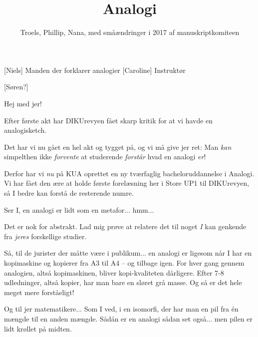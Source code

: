 \documentclass[a4paper,11pt]{article}
\title{Analogi}
\author{Troels, Phillip, Nana, med småændringer i 2017 af manuskriptkomiteen}
\begin{document}
\maketitle

\begin{roles}
[Niels] Manden der forklarer analogier
[Caroline] Instruktør
\end{roles}

\begin{props}
[Søren?]
\end{props}


\begin{sketch}

 Hej med jer!

 Efter første akt har DIKUrevyen fået skarp kritik for at vi havde en
analogisketch.


 Det har vi nu gået en hel akt og tygget på, og vi må give jer ret: Man
\emph{kan} simpelthen ikke \emph{forvente} at studerende \emph{forstår} hvad en
analogi \emph{er}!

 Derfor har vi \emph{nu} på KUA oprettet en ny tværfaglig
bacheloruddannelse i Analogi.  Vi har fået den ære at holde første forelæsning
her i Store UP1 til DIKUrevyen, så I bedre kan forstå de resterende numre.

 Ser I, en analogi er lidt som en metafor... hmm...


  Det er nok for abstrakt.  
Lad mig prøve at relatere det til noget \emph{I} kan genkende fra \emph{jeres}
forskellige studier.

 Så, til de jurister der måtte være i publikum... en analogi er ligesom
når I har en kopimaskine og kopierer fra A3 til A4 -- og tilbage igen.  For hver
gang gennem analogien, altså kopimaskinen, bliver kopi-kvaliteten
dårligere.  Efter 7-8 udledninger, altså kopier, har man bare en sløret grå
masse.  Og så er det hele meget mere forståeligt!


 Og til jer matematikere...  Som I ved, i en isomorfi, der har man en
pil fra én mængde til en anden mængde.  Sådán er en analogi sådan set
også... men pilen er lidt krøllet på midten. 


\end{sketch}
\end{document}

